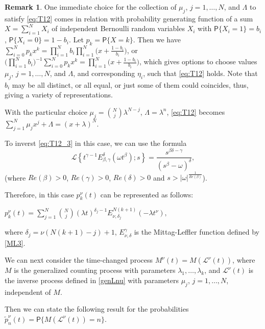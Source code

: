 \documentclass[12pt]{article}
\theoremstyle{definition}
\newtheorem{remark}{Remark}
\theoremstyle{plain}
\newcommand{\Prob}{\mathsf{P}}
\begin{document}
\begin{remark}
One immediate choice for the collection of $\mu_j$, $j=1,\ldots, N$, and $\Lambda$ to satisfy \eqref{eq:T12} comes in relation with probability generating function of a sum $X=\sum_{i=1}^{N} X_i$ of independent Bernoulli random variables $X_i$ with $\Prob\{X_i=1\}=b_i$, $\Prob\{X_i=0\}=1-b_i$. Let $p_k=\Prob\{X=k\}$. Then we have $\sum_{i=0}^{N} p_k x^k=\prod_{i=1}^{N} b_i\prod_{i=1}^{N}\big(x+\frac{1-b_i}{b_i}\big)$, or $\big(\prod_{i=1}^{N} b_i\big)^{-1}\sum_{i=0}^{N} p_k x^k=\prod_{i=1}^{N}\big(x+\frac{1-b_i}{b_i}\big)$, which gives options to choose values $\mu_j$, $j=1,\ldots, N$, and $\Lambda$, and corresponding $\eta_i$, such that \eqref{eq:T12} holds. Note that $b_i$ may be all distinct, or all equal, or just some of them could coincides, thus, giving a variety of representations.

With the particular choice $\mu_j=\binom{N}{j}\lambda^{N-j}$, $\Lambda=\lambda^n$, \eqref{eq:T12} becomes
			$\sum_{j=1}^N \mu_j x^j + \Lambda =  (x+\lambda)^N$.
			  
To inverst \eqref{eq:T12_3} in this case, we can use the formula
\begin{equation}
		\mathscr{L} \left\{ t^{\gamma-1} E_{\beta, \gamma}^\delta (\omega t^\beta); s \right\} = \frac{s^{\beta\delta - \gamma}}{(s^\beta - \omega)^\delta},
	\end{equation}
	(where $Re(\beta) > 0$, $Re(\gamma) > 0$, $Re(\delta) > 0$ and $s > |\omega|^{\frac{1}{Re(\beta)}}$).			
			 
			 Therefore, in this case
	 $p_k^\nu(t)$  can be represented as follows:
\begin{center}	 
	$
		p_k^\nu(t) = \sum_{j=1}^N \binom{N}{j}  (\lambda t)^{\delta_j - 1} E_{\nu, \delta_j}^{N(k+1)} (-\lambda t^\nu),
		$
		\end{center}
where $\delta_j=\nu(N(k+1)-j)+1$, $E_{\nu, \delta}^{\gamma}$ is the Mittag-Leffler function defined by \eqref{ML3}.
\end{remark}

\medskip

We can next consider the time-changed process $M^\nu(t)=M(\mathcal{L}^\nu(t))$, where $M$ is the generalized counting process with parameters $\lambda_1, \ldots, \lambda_k$, and $\mathcal{L}^\nu(t)$ is the inverse process defined in 
	\eqref{genLnu} with parameters $\mu_j$, $j=1,\dots,N$,   independent of $M$.

Then we can state the following result for the probabilities ${\tilde p}_n^\nu(t)=\Prob\{M(\mathcal{L}^\nu(t))=n\}$.
\end{document}
